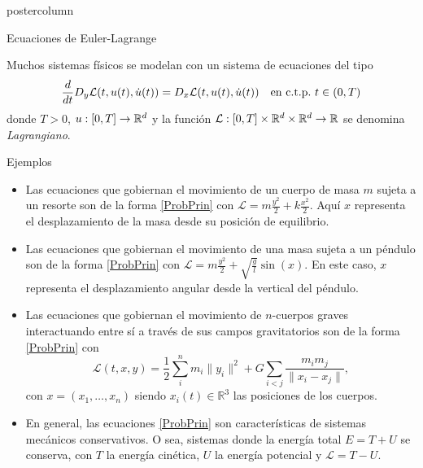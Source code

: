 \documentclass[final,hyperref={pdfpagelabels=false}]{beamer}
\newlength{\columnheight}
\begin{document}
\begin{frame}
  \begin{columns}
    \begin{column}{.49\textwidth}
      \begin{beamercolorbox}[center,wd=\textwidth]{postercolumn}
        \begin{minipage}[T]{.95\textwidth}  %
          \parbox[t][\columnheight]{\textwidth}{ %
            \begin{block}{Ecuaciones de Euler-Lagrange}

	      Muchos sistemas físicos se modelan con un sistema de ecuaciones del tipo
	       \begin{equation}\label{ProbPrin}
                    \frac{d}{dt} D_{y}\mathcal{L}(t,u(t),\dot{u}(t))= D_{x}\mathcal{L}(t,u(t),\dot{u}(t)) \quad \hbox{en c.t.p.}\ t \in (0,T)
              \end{equation}
              donde $T>0$, $u:[0,T]\to\mathbb{R}^d$ y la función   $\mathcal{L}:[0,T]\times\mathbb{R}^d\times\mathbb{R}^d\to\mathbb{R}$ se denomina \emph{Lagrangiano}.




            \end{block}
\begin{block}{Ejemplos}
 \begin{itemize}
  \item Las ecuaciones que gobiernan el movimiento de un cuerpo de masa $m$ sujeta a un  resorte son de la forma \eqref{ProbPrin} con $\mathcal{L}=m\frac{y^2}{2}+k\frac{x^2}{2}$. Aquí $x$ representa el desplazamiento de la masa  desde su posición de equilibrio.
 \item Las ecuaciones que gobiernan el movimiento de una masa sujeta a un péndulo son de la forma \eqref{ProbPrin} con $\mathcal{L}=m\frac{y^2}{2}+\sqrt{\frac{g}{l}}\sin(x)$. En este caso, $x$ representa el desplazamiento angular desde la vertical del péndulo.
 \item Las ecuaciones que gobiernan el movimiento de $n$-cuerpos graves interactuando entre sí a través de sus campos gravitatorios son de la forma \eqref{ProbPrin} con
 \[\mathcal{L}(t,x,y)=\frac12\sum_{i}^nm_i\|y_i\|^2+G\sum_{i<j}\frac{m_im_j}{\|x_i-x_j\|},\]
 con $x=(x_1,\ldots,x_n)$ siendo $x_i(t)\in\mathbb{R}^3$ las posiciones de los cuerpos.
 \item En general, las ecuaciones \eqref{ProbPrin} son características de sistemas mecánicos conservativos. O sea, sistemas donde la energía total $E=T+U$ se conserva, con $T$ la energía cinética, $U$ la energía potencial y $\mathcal{L}=T-U$.


\end{itemize}
\end{block}}
\end{minipage}
\end{beamercolorbox}
\end{column}
\end{columns}
\end{frame}
\end{document}
